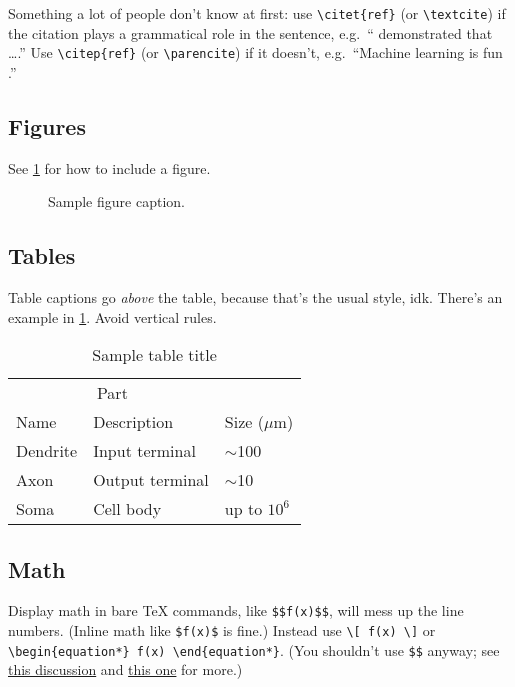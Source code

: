 \documentclass{article}
\begin{document}
Something a lot of people don't know at first:
use \verb+\citet{ref}+ (or \verb+\textcite+)
if the citation plays a grammatical role in the sentence,
e.g.\ ``\citet{transformers} demonstrated that \dots.''
Use \verb+\citep{ref}+ (or \verb+\parencite+)
if it doesn't, e.g.\ ``Machine learning is fun \citep{ml-is-fun}.''


\subsection{Figures}

See \cref{fig:sample} for how to include a figure.

\begin{figure}
  \centering
  \caption{Sample figure caption.}
  \label{fig:sample}
\end{figure}


\subsection{Tables}

Table captions go \emph{above} the table,
because that's the usual style, idk.
There's an example in \cref{tab:sample}.
Avoid vertical rules.

\begin{table}
  \caption{Sample table title}
  \label{tab:sample}
  \centering
  \begin{tabular}{lll}
    \toprule
    \multicolumn{2}{c}{Part}                   \\
    \cmidrule(r){1-2}
    Name     & Description     & Size ($\mu$m) \\
    \midrule
    Dendrite & Input terminal  & $\sim$100     \\
    Axon     & Output terminal & $\sim$10      \\
    Soma     & Cell body       & up to $10^6$  \\
    \bottomrule
  \end{tabular}
\end{table}

\subsection{Math}
Display math in bare TeX commands, like \texttt{\$\$f(x)\$\$}, will mess up the line numbers. (Inline math like \texttt{\$f(x)\$} is fine.)
Instead use \texttt{\textbackslash [ f(x) \textbackslash ]} or \texttt{\textbackslash begin\{equation*\} f(x) \textbackslash end\{equation*\}}.
(You shouldn't use \texttt{\$\$} anyway; see \href{https://tex.stackexchange.com/questions/503/why-is-preferable-to}{this discussion} and \href{https://tex.stackexchange.com/questions/40492/what-are-the-differences-between-align-equation-and-displaymath}{this one} for more.)
\end{document}
